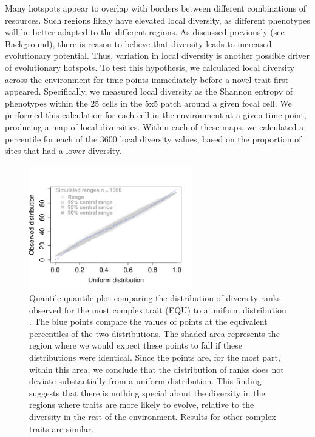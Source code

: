 \documentclass[letterpaper]{article}
\begin{document}
Many hotspots appear to overlap with borders between different combinations of resources. Such regions likely have elevated local diversity, as different phenotypes will be better adapted to the different regions. As discussed previously (see Background), there is reason to believe that diversity leads to increased evolutionary potential. Thus, variation in local diversity is another possible driver of evolutionary hotspots. To test this hypothesis, we calculated local diversity across the environment for time points immediately before a novel trait first appeared. Specifically, we measured local diversity as the Shannon entropy of phenotypes within the 25 cells in the 5x5 patch around a given focal cell. We performed this calculation for each cell in the environment at a given time point, producing a map of local diversities. Within each of these maps, we calculated a percentile for each of the 3600 local diversity values, based on the proportion of sites that had a lower diversity.

\begin{figure}[t]
\begin{center}
\includegraphics[width=2.8in]{figs/localdiversity.png}
\caption{Quantile-quantile plot comparing the distribution of diversity ranks observed for the most complex trait (EQU) to a uniform distribution \citep{oldford_qqtest:_2016}. The blue points compare the values of points at the equivalent percentiles of the two distributions. The shaded area represents the region where we would expect these points to fall if these distributions were identical. Since the points are, for the most part, within this area, we conclude that the distribution of ranks does not deviate substantially from a uniform distribution. This finding suggests that there is nothing special about the diversity in the regions where traits are more likely to evolve, relative to the diversity in the rest of the environment. Results for other complex traits are similar.}
\label{diversity}
\end{center}
\end{figure}
\end{document}
